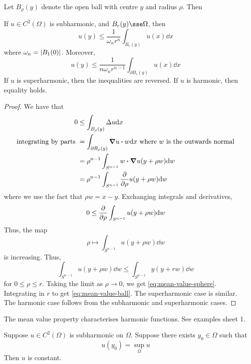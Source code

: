 \documentclass{article}
\begin{document}
Let \(B_\rho(y)\) denote the open ball with centre \(y\) and radius \(\rho\). Then
\begin{theorem}
     If \(u \in C^2(\Omega)\) is subharmonic, and \(B_r(y) \sse \Omega\), then
    \begin{equation}
        \label{eq:mean-value-ball}
        u(y) \le \frac{1}{\omega_n r^n}\int_{B_r(y)}u(x) \dd x
    \end{equation}
    where \(\omega_n = \abs{B_1(0)}\). Moreover,
    \begin{equation}
        \label{eq:mean-value-sphere}
        u(y) \le \frac{1}{n\omega_n r^{n-1}}\int_{\partial B_r(y)}u(x)\dd x
    \end{equation}
    If \(u\) is superharmonic, then the inequalities are reversed. If \(u\) is harmonic, then equality holds.
\end{theorem}

\begin{proof}
    We have that
    \begin{align*}
        0 &\le \int_{B_\rho(y)}\Delta u \dd x \\
        \text{integrating by parts } &= \int_{\partial B_\rho(y)}\grad u \vdot w \dd x \text{ where }w\text{ is the outwards normal} \\
        &= \rho^{n-1}\int_{S^{n-1}}w\vdot \grad u(y + \rho w)\dd w \\
        &= \rho^{n-1}\int_{S^{n-1}}\pdv{\rho}u(y + \rho w)\dd w \\
    \end{align*}
    where we use the fact that \(\rho w = x - y\). Exchanging integrals and derivatives,
    \[0 \le \pdv{\rho}\int_{S^{n-1}}u(y + \rho w)\dd w\]
    Thus, the map
    \[\rho \mapsto \int_{S^{n-1}}u(y + \rho w)\dd w\]
    is increasing. Thus,
    \[\int_{S^{n-1}}u(y + \rho w)\dd w \le \int_{S^{n-1}}y(y + r w)\dd w\]
    for \(0 \le \rho \le r\). Taking the limit as \(\rho \to 0\), we get \cref{eq:mean-value-sphere}. Integrating in \(r\) to get \cref{eq:mean-value-ball}. The superharmonic case is similar. The harmonic case follows from the subharmonic and superharmonic cases.
\end{proof}

\begin{remark}
    The mean value property characterises harmonic functions. See examples sheet 1.
\end{remark}

\lec

\begin{theorem}
     Suppose \(u \in C^2(\Omega)\) is subharmonic on \(\Omega\). Suppose there exists \(y_0 \in \Omega\) such that
    \[u(y_0) = \sup_\Omega u\]
    Then \(u\) is constant.
\end{theorem}
\end{document}
